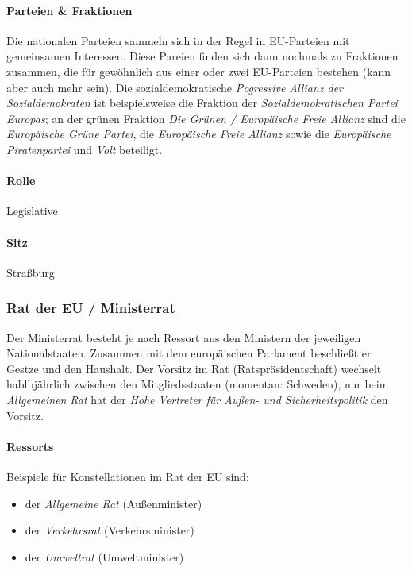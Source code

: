 \documentclass{article}
\begin{document}
	\paragraph{Parteien \& Fraktionen}
	Die nationalen Parteien sammeln sich in der Regel in EU-Parteien mit gemeinsamen Interessen. Diese Pareien finden sich dann nochmals zu Fraktionen zusammen, die für gewöhnlich aus einer oder zwei EU-Parteien bestehen (kann aber auch mehr sein). Die sozialdemokratische \textit{Pogressive Allianz der Sozialdemokraten} ist beispielsweise die Fraktion der \textit{Sozialdemokratischen Partei Europas}; an der grünen Fraktion \textit{Die Grünen / Europäische Freie Allianz} sind die \textit{Europäische Grüne Partei}, die \textit{Europäische Freie Allianz} sowie die \textit{Europäische Piratenpartei} und \textit{Volt} beteiligt. 

	\paragraph{Rolle}
	Legislative

	\paragraph{Sitz}
	Straßburg

	\subsubsection{Rat der EU / Ministerrat}
	Der Ministerrat besteht je nach Ressort aus den Ministern der jeweiligen Nationalstaaten. Zusammen mit dem europäischen Parlament beschließt er Gestze und den Haushalt. Der Vorsitz im Rat (Ratspräsidentschaft) wechselt hablbjährlich zwischen den Mitgliedsstaaten (momentan: Schweden), nur beim \textit{Allgemeinen Rat} hat der \textit{Hohe Vertreter für Außen- und Sicherheitspolitik} den Vorsitz.

	\paragraph{Ressorts}
	Beispiele für Konstellationen im Rat der EU sind:
	\begin{itemize}
		\item der \textit{Allgemeine Rat} (Außenminister)
		\item der \textit{Verkehrsrat} (Verkehrsminister)
		\item der \textit{Umweltrat} (Umweltminister)
	\end{itemize}
\end{document}
